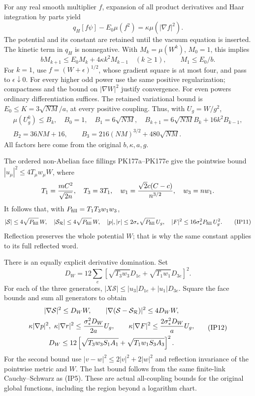 \documentclass[11pt]{article}
\begin{document}
For any real smooth multiplier \(f\), expansion of all product
derivatives and Haar integration by parts yield
\[
 q_H[f\psi]-E_0\mu(f^2)=\kappa\mu(|\nabla f|^2).
\]
The potential and its constant are retained until the vacuum equation
is inserted. The kinetic term in \(q_H\) is nonnegative. With
\(M_k=\mu(W^k)\), \(M_0=1\), this implies
\[
 bM_{k+1}\le E_0M_k+4\kappa k^2M_{k-1}\quad(k\ge1),\qquad
 M_1\le E_0/b.
\]
For \(k=1\), use \(f=(W+\epsilon)^{1/2}\), whose gradient square
is at most four, and pass to \(\epsilon\downarrow0\). For every
higher odd power use the same positive regularization; compactness
and the bound on \(|\nabla W|^2\) justify convergence. For even powers
ordinary differentiation suffices. The retained variational bound is
\(E_0\le K=3\sqrt{NM}/a\), at every positive coupling. Thus, with
\(U_g=W/g^2\),
\[
\begin{gathered}
 \mu(U_g^k)\le B_k,\quad
 B_0=1,\quad B_1=6\sqrt{NM},\quad
 B_{k+1}=6\sqrt{NM}B_k+16k^2B_{k-1},\\
 B_2=36NM+16,\qquad
 B_3=216(NM)^{3/2}+480\sqrt{NM}.
\end{gathered}\tag{IP10}
\]
All factors here come from the original \(b,\kappa,a,g\).

The ordered non-Abelian face fillings PK177a–PK177e give the pointwise
bound \(|u_\mu|^2\le4T_\mu w_\mu W\), where
\[
 T_1={mC^2\over\sqrt{2n}},\quad T_3=3T_1,\quad
 w_1={\sqrt2c(C-c)\over n^{3/2}},\quad w_3=nw_1.
\]
It follows that, with \(P_{\rm fill}=T_1T_3w_1w_3\),
\[
 |\mathcal S|\le4\sqrt{P_{\rm fill}}\,W,\quad
 |\mathcal S_{\mathcal R}|\le4\sqrt{P_{\rm fill}}\,W,\quad
 |p|,|r|\le2\sigma_*\sqrt{P_{\rm fill}}\,U_g,\quad
 |F|^2\le16\sigma_*^2P_{\rm fill}\,U_g^2.\tag{IP11}
\]
Reflection preserves the whole potential \(W\); that is why the same
constant applies to its full reflected word.

There is an equally explicit derivative domination. Set
\[
 D_W=12\sum_e
 \left[\sqrt{T_3w_3}D_{1e}+\sqrt{T_1w_1}D_{3e}\right]^2.
\]
For each of the three generators,
\(|X\mathcal S|\le|u_3|D_{1e}+|u_1|D_{3e}\).
Square the face bounds and sum all generators to obtain
\[
\begin{gathered}
 |\nabla\mathcal S|^2\le D_W W,\qquad
 |\nabla(\mathcal S-\mathcal S_{\mathcal R})|^2\le4D_WW,\\
 \kappa|\nabla p|^2,\ \kappa|\nabla r|^2
       \le{\sigma_*^2D_W\over2a}U_g,\qquad
 \kappa|\nabla F|^2\le{2\sigma_*^2D_W\over a}U_g,\\
 D_W\le12\left[
 \sqrt{T_3w_3S_1A_1}+\sqrt{T_1w_1S_3A_3}\right]^2.
\end{gathered}\tag{IP12}
\]
For the second bound use \(|v-w|^2\le2|v|^2+2|w|^2\)
and reflection invariance of the pointwise metric and \(W\).
The last bound follows from the same finite-link Cauchy–Schwarz as
(IP5). These are actual all-coupling bounds for the original global
functions, including the region beyond a logarithm chart.
\end{document}
